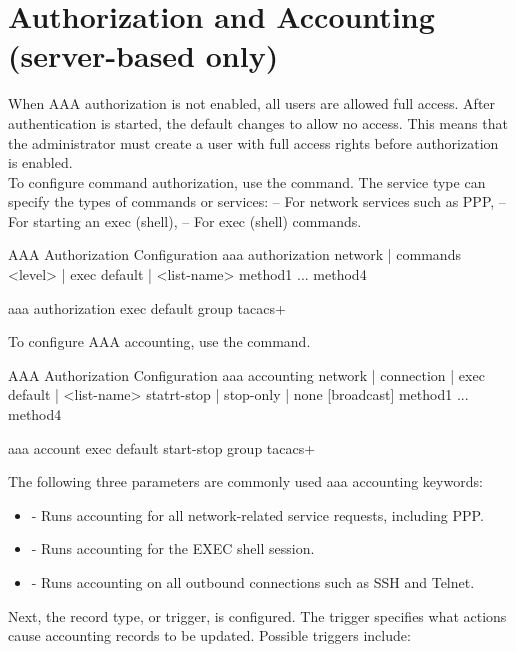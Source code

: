 \section{Authorization and Accounting (server-based only)}

When AAA authorization is not enabled, all users are allowed full access. After authentication is started, the default changes to allow no access. This means that the administrator must create a user with full access rights before authorization is enabled. \\

To configure command authorization, use the  command. The service type can specify the types of commands or services:
 -- For network services such as PPP,  -- For starting an exec (shell),  -- For exec (shell) commands. 

\begin{sexylisting}{AAA Authorization Configuration}
aaa authorization {network | commands <level> | exec} {default | <list-name>} 
  method1 ... method4
  
aaa authorization exec default group tacacs+
\end{sexylisting}

To configure AAA accounting, use the  command. 

\begin{sexylisting}{AAA Authorization Configuration}
aaa accounting {network | connection | exec} {default | <list-name>} 
         {statrt-stop | stop-only | none} [broadcast] method1 ... method4

aaa account exec default start-stop group tacacs+
\end{sexylisting}

The following three parameters are commonly used aaa accounting keywords:

\begin{itemize}
\item {} - Runs accounting for all network-related service requests, including PPP.
\item {} - Runs accounting for the EXEC shell session.
\item {} - Runs accounting on all outbound connections such as SSH and Telnet.
\end{itemize}

Next, the record type, or trigger, is configured. The trigger specifies what actions cause accounting records to be updated. Possible triggers include:

